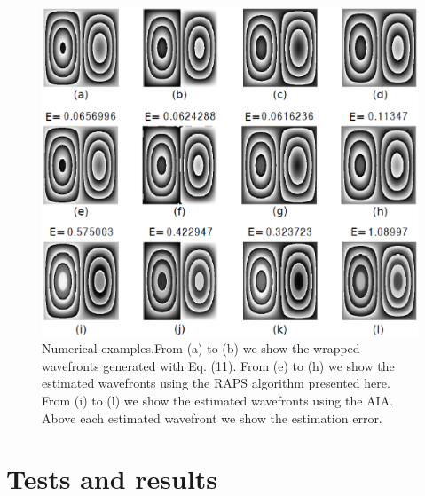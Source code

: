 \begin{figure}[th!]
	\begin{center}
		\includegraphics[scale=0.4]{Chpt3_figures/fig_1.eps}
	\end{center}
	\caption{Numerical examples.From (a) to (b) we show the wrapped
	wavefronts generated with Eq. (11). From (e) to (h) we show the
	estimated wavefronts using the RAPS algorithm presented here. From
	(i) to (l) we show the estimated wavefronts using the AIA. Above each
	estimated wavefront we show the estimation error.} 
	\label{fig:SimPhaseComparisonRAPS}
\end{figure}

\section{Tests and results}

